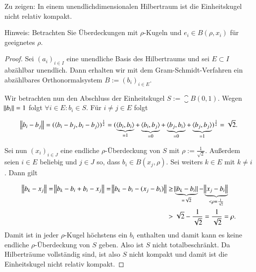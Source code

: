 
\begin{exercise}
  Zu zeigen: In einem unendlichdimensionalen Hilbertraum ist die Einheitskugel nicht relativ kompakt.

  Hinweis: Betrachten Sie Überdeckungen mit $\rho$-Kugeln und $e_i \in B(\rho,x_i)$ für geeignetes $\rho$.
\end{exercise}
\begin{proof}
  Sei ${(a_i)}_{i \in I}$ eine unendliche Basis des Hilbertraums und sei $E \subset I$ abzählbar unendlich. Dann erhalten wir mit dem Gram-Schmidt-Verfahren ein abzählbares Orthonormalsystem $B:={(b_i)}_{i \in E}$.

  Wir betrachten nun den Abschluss der Einheitskugel $S:=\closure{B(0,1)}$. Wegen $\norm{b_i}=1$ folgt $\forall i \in E: b_i \in S$. Für $i \neq j \in E$ folgt

  \begin{equation*}
    \norm{b_i-b_j}={(\langle {b_i-b_j},{b_i-b_j} \rangle)}^{\frac{1}{2}}={(\underbrace{\langle {b_i},{b_i} \rangle}_{=1}+\underbrace{\langle {b_i},{b_j} \rangle}_{=0}+ \underbrace{\langle {b_j},{b_i} \rangle}_{=0} + \underbrace{\langle {b_j},{b_j} \rangle}_{=1})}^{\frac{1}{2}} = \sqrt{2}.
  \end{equation*}

  Sei nun ${(x_i)}_{i \in J}$ eine endliche $\rho$-Überdeckung von $S$ mit $\rho:=\frac{1}{\sqrt{2}}$. Außerdem seien $i \in E$ beliebig und $j \in J$ so, dass $b_i \in B(x_j,\rho)$. Sei weiters $k \in E$ mit $k \neq i$. Dann gilt

  \begin{equation*}
    \begin{split}
      \norm{b_k-x_j}=\norm{b_k-b_i+b_i-x_j}
      =\norm{b_k-b_i-(x_j-b_i)}
      &\geq \underbrace{\norm{b_k-b_i}}_{=\sqrt{2}} - \underbrace{\norm{x_j-b_i}}_{< \rho=\frac{1}{\sqrt{2}}} \\
      &> \sqrt{2}-\frac{1}{\sqrt{2}}=\frac{1}{\sqrt{2}}=\rho.
    \end{split}
  \end{equation*}
  Damit ist in jeder $\rho$-Kugel höchstens ein $b_i$ enthalten und damit kann es keine endliche $\rho$-Überdeckung von $S$ geben. Also ist $S$ nicht totalbeschränkt. Da Hilberträume vollständig sind, ist also $S$ nicht kompakt und damit ist die Einheitskugel nicht relativ kompakt.
\end{proof}
